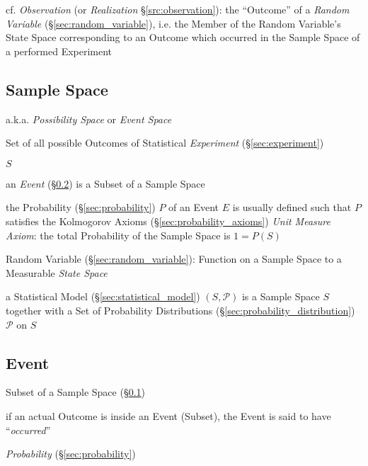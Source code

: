 \fist cf. \emph{Observation} (or \emph{Realization} \S\ref{src:observation}):
the ``Outcome'' of a \emph{Random Variable} (\S\ref{sec:random_variable}), i.e.
the Member of the Random Variable's State Space corresponding to an Outcome
which occurred in the Sample Space of a performed Experiment



\subsection{Sample Space}\label{sec:sample_space}

a.k.a. \emph{Possibility Space} or \emph{Event Space}

Set of all possible Outcomes of Statistical \emph{Experiment}
(\S\ref{sec:experiment})

$S$

an \emph{Event} (\S\ref{sec:probability_event}) is a Subset of a Sample Space

the Probability (\S\ref{sec:probability}) $P$ of an Event $E$ is usually defined
such that $P$ satisfies the Kolmogorov Axioms (\S\ref{sec:probability_axioms})
\fist \emph{Unit Measure Axiom}: the total Probability of the Sample Space is
$1 = P(S)$

Random Variable (\S\ref{sec:random_variable}): Function on a Sample Space to a
Measurable \emph{State Space}

a Statistical Model (\S\ref{sec:statistical_model}) $(S,\mathcal{P})$ is a
Sample Space $S$ together with a Set of Probability Distributions
(\S\ref{sec:probability_distribution}) $\mathcal{P}$ on $S$



\subsection{Event}\label{sec:probability_event}

Subset of a Sample Space (\S\ref{sec:sample_space})

if an actual Outcome is inside an Event (Subset), the Event is said to have
``\emph{occurred}''

\emph{Probability} (\S\ref{sec:probability})

